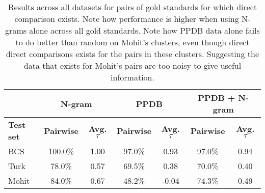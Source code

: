 \begin{table}
\small
\centering
\begin{tabular}{|l|cc|cc|cc|}
	\hline 
	& \multicolumn{2}{c|}{N-gram} 
	& \multicolumn{2}{c|}{PPDB} 
	& \multicolumn{2}{c|}{PPDB + N-gram} \\
	\hline 
	\bf Test set
	& \bf Pairwise & \bf Avg. $\tau$ 
	& \bf Pairwise & \bf Avg. $\tau$ 
	& \bf Pairwise & \bf Avg. $\tau$ \\
	\hline
	BCS   & 100.0\% & 1.00 & 97.0\% &  0.93 & 97.0\% & 0.94 \\
	Turk  & 78.0\%  & 0.57 & 69.5\% &  0.38 & 70.0\% & 0.40 \\
	Mohit & 84.0\%  & 0.67 & 48.2\% & -0.04 & 74.3\% & 0.49 \\
	\hline
\end{tabular}
\caption{\label{font-table} Results across all datasets for pairs of gold standards for which direct comparison exists. Note how performance is higher when using N-grams alone across all gold standards. Note how PPDB data alone fails to do better than random on Mohit's clusters, even though direct direct comparisons exists for the pairs in these clusters. Suggesting the data that exists for Mohit's pairs are too noisy to give useful information. }
\end{table}




























